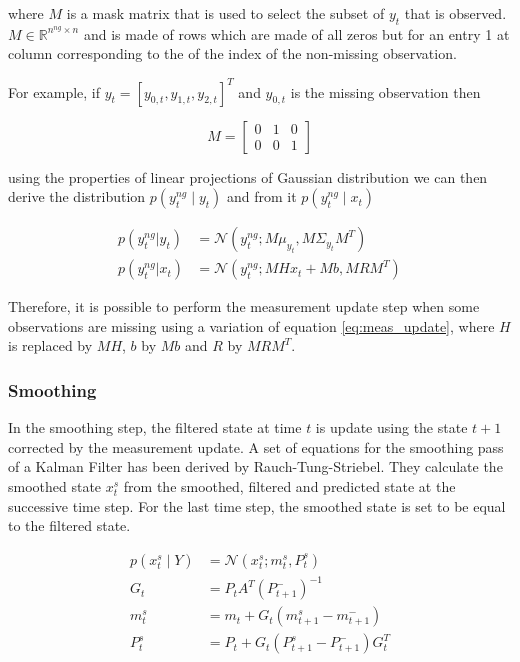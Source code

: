 \documentclass{article}
\newcommand{\norm}[3]{\mathcal{N}\left(#1; #2, #3\right)} %
\begin{document}
where $M$ is a mask matrix that is used to select the subset of $y_t$ that is observed. $M \in \mathbb{R}^{n^{ng} \times n}$ and is made of rows which are made of all zeros but for an entry 1 at column corresponding to the of the index of the non-missing observation.

For example, if $y_t = [y_{0,t}, y_{1,t}, y_{2,t}]^T$ and $y_{0,t}$ is the missing observation then

\begin{equation}
 M = \left[\begin{array}{ccc}
    0 & 1 & 0 \\
    0 & 0 & 1
\end{array}\right]
\end{equation}

 using the properties of linear projections of Gaussian distribution we can then derive the distribution $p(y^{ng}_t \mid y_t)$ and from it $p(y^{ng}_t \mid x_t)$ 

\begin{align}
   p(y^{ng}_t|y_t) &= \norm{y^{ng}_t}{M\mu_{y_t}}{M\Sigma_{y_t}M^T} \label{eq:partial_obs}\\
  p(y^{ng}_t|x_t) &= \norm{y^{ng}_t}{MHx_t + Mb}{MRM^T}\label{eq:partial_obs_state}
\end{align}

Therefore, it is possible to perform the measurement update step when some observations are missing using a variation of equation \ref{eq:meas_update}, where $H$ is replaced by $MH$, $b$ by $Mb$ and $R$ by $MRM^T$.

\subsubsection{Smoothing}

In the smoothing step, the filtered state at time $t$ is update using the state ${t+1}$ corrected by the measurement update. A set of equations for the smoothing pass of a Kalman Filter has been derived by Rauch-Tung-Striebel. They calculate the smoothed state $x_t^s$ from the smoothed, filtered and predicted state at the successive time step.
For the last time step, the smoothed state is set to be equal to the filtered state.

\begin{align}
    p(x_t^s \mid Y) &= \norm{x_t^s}{m_t^s}{P_t^s} \label{eq:smoother}\\
    G_t &= P_tA^T(P_{t+1}^-)^{-1} \label{eq:smoother:gain}\\
    m_t^s &= m_t + G_t(m_{t+1}^s - m_{t+1}^-) \label{eq:smoother:mean}\\
    P_t^s &= P_t + G_t(P_{t+1}^s - P_{t+1}^-)G_t^T \label{eq:smoother:cov}
\end{align}
\end{document}
